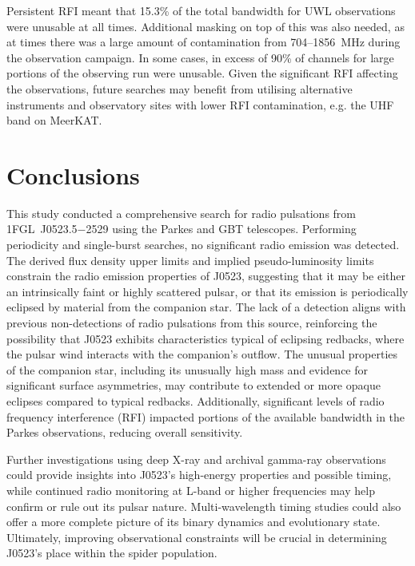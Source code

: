 Persistent RFI meant that 15.3\% of the total bandwidth for UWL observations were unusable at all times. Additional masking on top of this was also needed, as at times there was a large amount of contamination from 704--1856~MHz during the observation campaign. In some cases, in excess of 90\% of channels for large portions of the observing run were unusable. Given the significant RFI affecting the observations, future searches may benefit from utilising alternative instruments and observatory sites with lower RFI contamination, e.g. the UHF band on MeerKAT. 

\section{Conclusions}
This study conducted a comprehensive search for radio pulsations from 1FGL~J0523.5$-$2529 using the Parkes and GBT telescopes. Performing periodicity and single-burst searches, no significant radio emission was detected. The derived flux density upper limits and implied pseudo-luminosity limits constrain the radio emission properties of J0523, suggesting that it may be either an intrinsically faint or highly scattered pulsar, or that its emission is periodically eclipsed by material from the companion star. The lack of a detection aligns with previous non-detections of radio pulsations from this source, reinforcing the possibility that J0523 exhibits characteristics typical of eclipsing redbacks, where the pulsar wind interacts with the companion's outflow. The unusual properties of the companion star, including its unusually high mass and evidence for significant surface asymmetries, may contribute to extended or more opaque eclipses compared to typical redbacks. Additionally, significant levels of radio frequency interference (RFI) impacted portions of the available bandwidth in the Parkes observations, reducing overall sensitivity.

Further investigations using deep X-ray and archival gamma-ray observations could provide insights into J0523’s high-energy properties and possible timing, while continued radio monitoring at L-band or higher frequencies may help confirm or rule out its pulsar nature. Multi-wavelength timing studies could also offer a more complete picture of its binary dynamics and evolutionary state. Ultimately, improving observational constraints will be crucial in determining J0523's place within the spider population. 